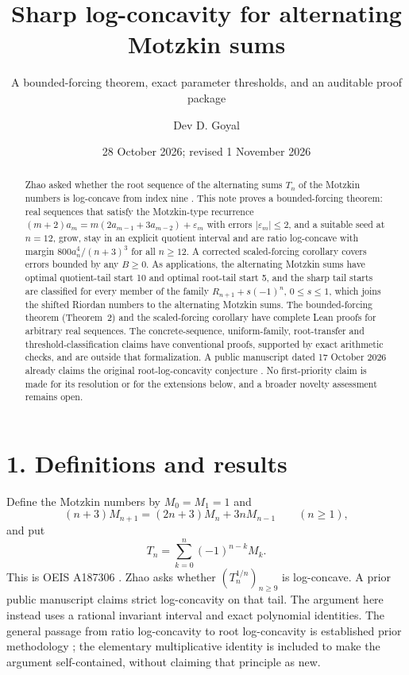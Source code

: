 \documentclass[
  11pt,
  a4paper,
]{article}
\title{Sharp log-concavity for alternating Motzkin sums}
\subtitle{A bounded-forcing theorem, exact parameter thresholds, and an
auditable proof package}
\author{Dev D. Goyal}
\date{28 October 2026; revised 1 November 2026}
\begin{document}
\maketitle

\begin{abstract}
Zhao asked whether the root sequence of the alternating sums \(T_n\) of
the Motzkin numbers is log-concave from index nine
\cite[Conjecture~1, p.~8]{Z}. This note proves a bounded-forcing theorem:
real sequences that satisfy the Motzkin-type recurrence
\((m+2)a_m=m(2a_{m-1}+3a_{m-2})+\varepsilon_m\) with errors
\(|\varepsilon_m|\le2\), and a suitable seed at \(n=12\), grow, stay in an
explicit quotient interval and are ratio log-concave with margin
\(800a_n^4/(n+3)^3\) for all \(n\ge12\). A corrected scaled-forcing
corollary covers errors bounded by any \(B\ge0\). As applications, the
alternating Motzkin sums have optimal quotient-tail start 10 and optimal
root-tail start 5, and the sharp tail starts are classified for every
member of the family \(R_{n+1}+s(-1)^n\), \(0\le s\le1\), which joins the
shifted Riordan numbers to the alternating Motzkin sums. The bounded-forcing
theorem (Theorem~2) and the scaled-forcing corollary have complete Lean
proofs for arbitrary real sequences. The concrete-sequence, uniform-family,
root-transfer and threshold-classification claims have conventional proofs,
supported by exact arithmetic checks, and are outside that formalization.
A public manuscript dated 17 October 2026 already claims the original
root-log-concavity conjecture \cite{P}. No first-priority claim is made for
its resolution or for the extensions below, and a broader novelty
assessment remains open.
\end{abstract}

\section{1. Definitions and results}\label{definitions-and-results}

Define the Motzkin numbers by \(M_0=M_1=1\) and \[
(n+3)M_{n+1}=(2n+3)M_n+3nM_{n-1}\qquad(n\ge1),
\] and put \[
T_n=\sum_{k=0}^n(-1)^{n-k}M_k.
\] This is OEIS A187306 \cite{O2}. Zhao \cite[Conjecture~1, p.~8]{Z} asks whether \((T_n^{1/n})_{n\ge9}\)
is log-concave. A prior public manuscript \cite{P} claims strict
log-concavity on that tail. The argument here instead uses a rational
invariant interval and exact polynomial identities. The general passage
from ratio log-concavity to root log-concavity is established prior
methodology \cite{CGW}; the elementary multiplicative identity is
included to make the argument self-contained, without claiming that
principle as new.
\end{document}
